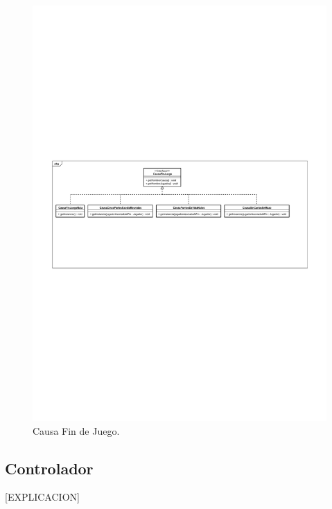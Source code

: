 \begin{figure}[H]
	\centering
	\includegraphics[scale=0.8]{includes/class_CausaFinJuego}
	\caption{Causa Fin de Juego.}
	\label{class_CausaFinJuego}
\end{figure}

\subsection{Controlador}

[EXPLICACION]

